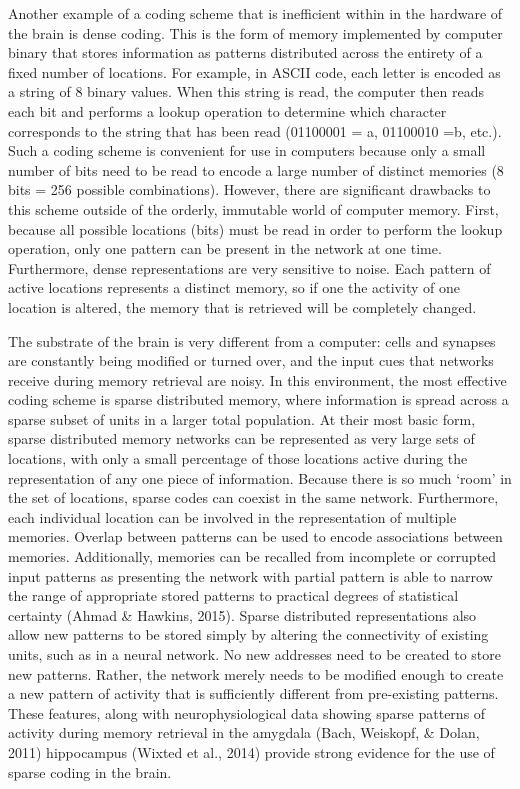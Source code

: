 \documentclass[12pt,a4paperpaper,]{report}
\begin{document}
Another example of a coding scheme that is inefficient within in the
hardware of the brain is dense coding. This is the form of memory
implemented by computer binary that stores information as patterns
distributed across the entirety of a fixed number of locations. For
example, in ASCII code, each letter is encoded as a string of 8 binary
values. When this string is read, the computer then reads each bit and
performs a lookup operation to determine which character corresponds to
the string that has been read (01100001 = a, 01100010 =b, etc.). Such a
coding scheme is convenient for use in computers because only a small
number of bits need to be read to encode a large number of distinct
memories (8 bits = 256 possible combinations). However, there are
significant drawbacks to this scheme outside of the orderly, immutable
world of computer memory. First, because all possible locations (bits)
must be read in order to perform the lookup operation, only one pattern
can be present in the network at one time. Furthermore, dense
representations are very sensitive to noise. Each pattern of active
locations represents a distinct memory, so if one the activity of one
location is altered, the memory that is retrieved will be completely
changed.

The substrate of the brain is very different from a computer: cells and
synapses are constantly being modified or turned over, and the input
cues that networks receive during memory retrieval are noisy. In this
environment, the most effective coding scheme is sparse distributed
memory, where information is spread across a sparse subset of units in a
larger total population. At their most basic form, sparse distributed
memory networks can be represented as very large sets of locations, with
only a small percentage of those locations active during the
representation of any one piece of information. Because there is so much
`room' in the set of locations, sparse codes can coexist in the same
network. Furthermore, each individual location can be involved in the
representation of multiple memories. Overlap between patterns can be
used to encode associations between memories. Additionally, memories can
be recalled from incomplete or corrupted input patterns as presenting
the network with partial pattern is able to narrow the range of
appropriate stored patterns to practical degrees of statistical
certainty (Ahmad \& Hawkins, 2015). Sparse distributed representations
also allow new patterns to be stored simply by altering the connectivity
of existing units, such as in a neural network. No new addresses need to
be created to store new patterns. Rather, the network merely needs to be
modified enough to create a new pattern of activity that is sufficiently
different from pre-existing patterns. These features, along with
neurophysiological data showing sparse patterns of activity during
memory retrieval in the amygdala (Bach, Weiskopf, \& Dolan, 2011)
hippocampus (Wixted et al., 2014) provide strong evidence for the use of
sparse coding in the brain.
\end{document}
